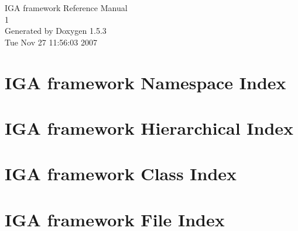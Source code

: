 \documentclass[a4paper]{book}
\begin{document}
\begin{titlepage}
\vspace*{7cm}
\begin{center}
{\Large IGA framework Reference Manual\\[1ex]\large 1 }\\
\vspace*{1cm}
{\large Generated by Doxygen 1.5.3}\\
\vspace*{0.5cm}
{\small Tue Nov 27 11:56:03 2007}\\
\end{center}
\end{titlepage}
\clearemptydoublepage
{}
\tableofcontents
\clearemptydoublepage
{}
\chapter{IGA framework Namespace Index}

\chapter{IGA framework Hierarchical Index}

\chapter{IGA framework Class Index}

\chapter{IGA framework File Index}

\end{document}
